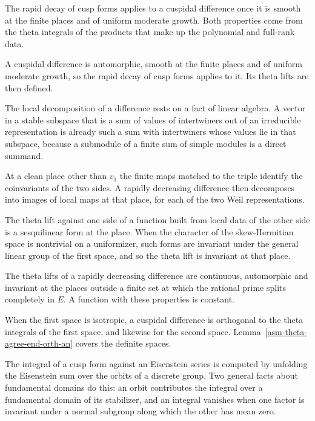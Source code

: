 The rapid decay of cusp forms applies to a cuspidal difference once it is smooth
at the finite places and of uniform moderate growth. Both properties come from
the theta integrals of the products that make up the polynomial and full-rank
data.

A cuspidal difference is automorphic, smooth at the finite places and of
uniform moderate growth, so the rapid decay of cusp forms applies to it. Its
theta lifts are then defined.

The local decomposition of a difference rests on a fact of linear algebra. A
vector in a stable subspace that is a sum of values of intertwiners out of an
irreducible representation is already such a sum with intertwiners whose values
lie in that subspace, because a submodule of a finite sum of simple modules is
a direct summand.

At a clean place other than $v_1$ the finite maps matched to the triple identify
the coinvariants of the two sides. A rapidly decreasing difference then
decomposes into images of local maps at that place, for each of the two Weil
representations.

The theta lift against one side of a function built from local data of the
other side is a sesquilinear form at the place. When the character of the
skew-Hermitian space is nontrivial on a uniformizer, such forms are invariant
under the general linear group of the first space, and so the theta lift is
invariant at that place.

The theta lifts of a rapidly decreasing difference are continuous, automorphic
and invariant at the places outside a finite set at which the rational prime
splits completely in $E$. A function with these properties is constant.

When the first space is isotropic, a cuspidal difference is orthogonal to the
theta integrals of the first space, and likewise for the second space.
Lemma~\ref{asm-theta-agree-end-orth-an} covers the definite spaces.

The integral of a cusp form against an Eisenstein series is computed by
unfolding the Eisenstein sum over the orbits of a discrete group. Two general
facts about fundamental domains do this: an orbit contributes the integral over
a fundamental domain of its stabilizer, and an integral vanishes when one factor
is invariant under a normal subgroup along which the other has mean zero.

